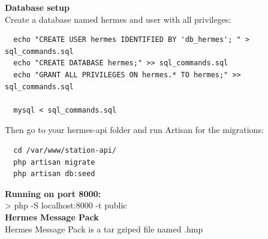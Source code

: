 \documentclass[11pt,a4paper]{article}
\begin{document}
\textbf{Database setup}\\

Create a database named hermes and user with all privileges:

\begin{verbatim}
  echo "CREATE USER hermes IDENTIFIED BY 'db_hermes'; " > sql_commands.sql
  echo "CREATE DATABASE hermes;" >> sql_commands.sql
  echo "GRANT ALL PRIVILEGES ON hermes.* TO hermes;" >> sql_commands.sql
  
  mysql < sql_commands.sql
\end{verbatim}

Then go to your hermes-api folder and run Artisan for the migrations:
\begin{verbatim}
  cd /var/www/station-api/
  php artisan migrate
  php artisan db:seed    
\end{verbatim}

\textbf{Running on port 8000:}\\

> php -S localhost:8000 -t public\\

\textbf{Hermes Message Pack}\\
Hermes Message Pack is a tar gziped file named .hmp\\






\end{document}

